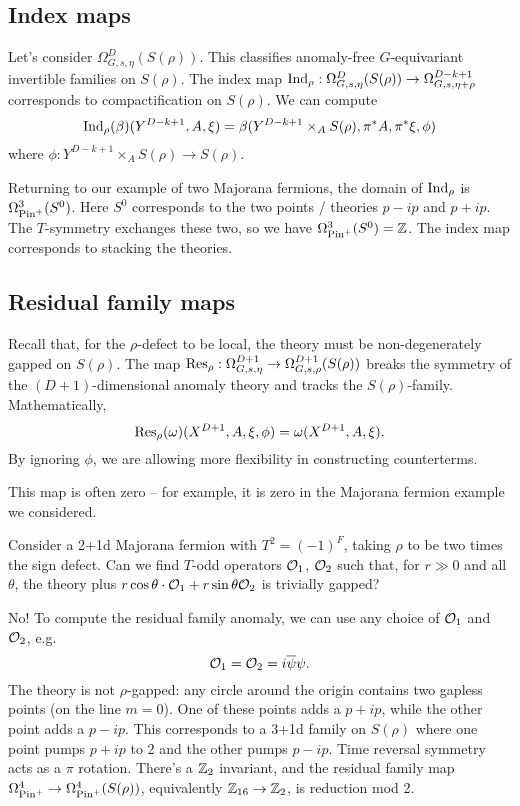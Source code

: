 \subsection{Index maps}

Let's consider $\Omega^D_{G,s,\eta}(S(\rho))$.
This classifies anomaly-free $G$-equivariant invertible families on $S(\rho)$.
The index map $\operatorname{Ind}_\rho: \Omega^D_{G,s,\eta}(S(\rho)) \to \Omega^{D-k+1}_{G,s,\eta+\rho}$ corresponds to compactification on $S(\rho)$.
We can compute
\[
	\operatorname{Ind}_\rho(\beta)(Y^{D-k+1},A,\xi) = \beta(Y^{D-k+1} \times_A S(\rho), \pi^* A, \pi^*\xi, \phi)
\]
where $\phi: Y^{D-k+1} \times_A S(\rho) \to S(\rho)$.

\begin{ex}
	Returning to our example of two Majorana fermions, the domain of $\operatorname{Ind}_\rho$ is $\Omega^3_{\mathrm{Pin}^+}(S^0)$.
	Here $S^0$ corresponds to the two points / theories $p - ip$ and $p + ip$.
	The $T$-symmetry exchanges these two, so we have $\Omega^3_{\mathrm{Pin}^+}(S^0) = \mathbb{Z}$.
	The index map corresponds to stacking the theories.
\end{ex}

\subsection{Residual family maps}

Recall that, for the $\rho$-defect to be local, the theory must be non-degenerately gapped on $S(\rho)$.
The map $\operatorname{Res}_\rho: \Omega^{D+1}_{G,s,\eta} \to \Omega^{D+1}_{G,s,\rho}(S(\rho))$ breaks the symmetry of the $(D+1)$-dimensional anomaly theory and tracks the $S(\rho)$-family.
Mathematically,
\[
	\operatorname{Res}_\rho(\omega)(X^{D+1}, A, \xi, \phi) = \omega(X^{D+1}, A, \xi).
\]
By ignoring $\phi$, we are allowing more flexibility in constructing counterterms.

This map is often zero -- for example, it is zero in the Majorana fermion example we considered.

\begin{ex}
	Consider a 2+1d Majorana fermion with $T^2 = (-1)^F$, taking $\rho$ to be two times the sign defect.
	Can we find $T$-odd operators $\mathcal{O}_1$, $\mathcal{O}_2$ such that, for $r \gg 0$ and all $\theta$, the theory plus $r \cos \theta \cdot \mathcal{O}_1 + r \sin \theta \mathcal{O}_2$ is trivially gapped?
	
	No!
	To compute the residual family anomaly, we can use any choice of $\mathcal{O}_1$ and $\mathcal{O}_2$, e.g.\
	\[
		\mathcal{O}_1 = \mathcal{O}_2 = i \overline{\psi} \psi.
	\]
	The theory is not $\rho$-gapped: any circle around the origin contains two gapless points (on the line $m = 0$).
	One of these points adds a $p + ip$, while the other point adds a $p - ip$.
	This corresponds to a 3+1d family on $S(\rho)$ where one point pumps $p+ip$ to 2 and the other pumps $p-ip$.
	Time reversal symmetry acts as a $\pi$ rotation.
	There's a $\mathbb{Z}_2$ invariant, and the residual family map $\Omega^4_{\mathrm{Pin}^+} \to \Omega^4_{\mathrm{Pin}^+}(S(\rho))$, equivalently $\mathbb{Z}_{16} \to \mathbb{Z}_2$, is reduction mod 2.
\end{ex}

